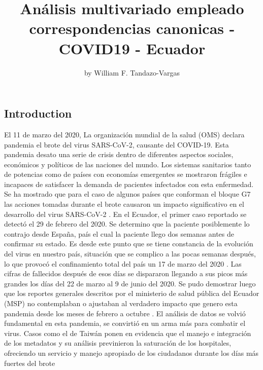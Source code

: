 \title{Análisis multivariado empleado correspondencias canonicas -
COVID19 - Ecuador}
\author{by William F. Tandazo-Vargas}

\maketitle


\hypertarget{introduction}{%
\subsection{Introduction}\label{introduction}}

El 11 de marzo del 2020, La organización mundial de la salud (OMS)
declara pandemia el brote del virus SARS-CoV-2, causante del COVID-19.
Esta pandemia desato una serie de crisis dentro de diferentes aspectos
sociales, económicos y políticos de las naciones del mundo. Los sistemas
sanitarios tanto de potencias como de países con economías emergentes se
mostraron frágiles e incapaces de satisfacer la demanda de pacientes
infectados con esta enfermedad. Se ha mostrado que para el caso de
algunos países que conforman el bloque G7 las acciones tomadas durante
el brote causaron un impacto significativo en el desarrollo del virus
SARS-CoV-2 \citep{ZHANG2020109829}. En el Ecuador, el primer caso
reportado se detectó el 29 de febrero del 2020. Se determino que la
paciente posiblemente lo contrajo desde España, país el cual la paciente
llego dos semanas antes de confirmar su estado. Es desde este punto que
se tiene constancia de la evolución del virus en nuestro país, situación
que se complico a las pocas semanas después, lo que provocó el
confinamiento total del país un 17 de marzo del 2020 \citep{Haro2020}.
Las cifras de fallecidos después de esos días se dispararon llegando a
sus picos más grandes los días del 22 de marzo al 9 de junio del 2020.
Se pudo demostrar luego que los reportes generales descritos por el
ministerio de salud pública del Ecuador (MSP) no contemplaban o
ajustaban al verdadero impacto que genero esta pandemia desde los meses
de febrero a octubre \citep{CEVALLOSVALDIVIEZO2021297}. El análisis de
datos se volvió fundamental en esta pandemia, se convirtió en un arma
más para combatir el virus. Casos como el de Taiwán ponen en evidencia
que el manejo e integración de los metadatos y su análisis previnieron
la saturación de los hospitales, ofreciendo un servicio y manejo
apropiado de los ciudadanos durante los días más fuertes del brote
